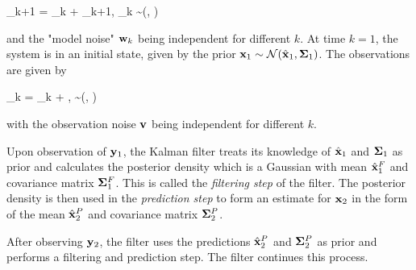 \bee
\xbf_{k+1} = \Abf \xbf_k + \wbf_{k+1}, \quad \wbf_k \sim \Nc(\zerobf, \Qbf)
\eee

and the "model noise" $\mathbf{w}_k$ being independent for different $k$. At time $k=1$, the system is in an initial state, given by the prior $\mathbf{x}_1 \sim \mathcal{N}(\hat {\mathbf{x}}_1, \mathbf{\Sigma}_1)$. The observations are given by

\bee
\ybf_k = \Gbf \xbf_k + \vbf, \quad \vbf \sim \Nc(\zerobf, \Rbf)
\eee

with the observation noise $\mathbf{v}$ being independent for different $k$.

Upon observation of $\mathbf{y}_1$, the Kalman filter treats its knowledge of $\hat {\mathbf{x}}_1$ and $\mathbf{\Sigma}_1$ as prior and calculates the posterior density which is a Gaussian with mean $\hat{\mathbf{x}}_1^F$ and covariance matrix $\mathbf{\Sigma}_1^F$. This is called the \emph{filtering step} of the filter. The posterior density is then used in the \emph{prediction step} to form an estimate for $\mathbf{x}_2$ in the form of the mean $\hat{\mathbf{x}}_2^P$ and covariance matrix $\mathbf{\Sigma}_2^P$.

After observing $\mathbf{y}_2$, the filter uses the predictions $\hat{\mathbf{x}}_2^P$ and $\mathbf{\Sigma}_2^P$ as prior and performs a filtering and prediction step. The filter continues this process.




